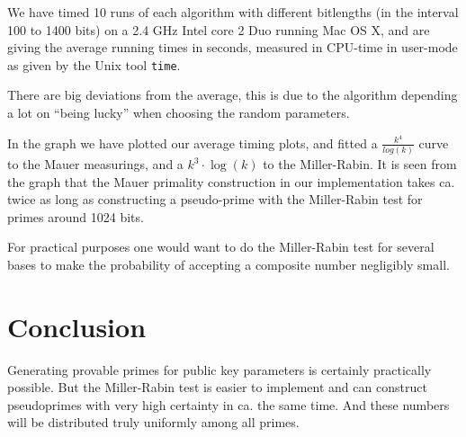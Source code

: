 \documentclass[11pt,a4paper]{article}
\begin{document}
We have timed 10 runs of each algorithm with different bitlengths (in
the interval 100 to 1400 bits) on a 2.4 GHz Intel core 2 Duo running
Mac OS X, and are giving the average running times in seconds,
measured in CPU-time in user-mode as given by the Unix tool
\verb|time|. 

There are big deviations from the average, this is due to the
algorithm depending a lot on ``being lucky'' when choosing the random
parameters.

In the graph we have plotted our average timing plots, and fitted a
$\frac{k^4}{log(k)}$ curve to the Mauer measurings, and a
$k^3\cdot\log(k)$ to the Miller-Rabin.  It is seen from the graph that the Mauer
primality construction in our implementation takes ca. twice as long
as constructing a pseudo-prime with the Miller-Rabin test for primes
around 1024 bits.

For practical purposes one would want to do the Miller-Rabin test for
several bases to make the probability of accepting a composite number
negligibly small.
\section{Conclusion}
Generating provable primes for public key parameters is certainly
practically possible. But the Miller-Rabin test is easier to implement and
can construct pseudoprimes with very high certainty in ca. the same
time. And these numbers will be distributed truly uniformly among all
primes. 
{}

\end{document}
